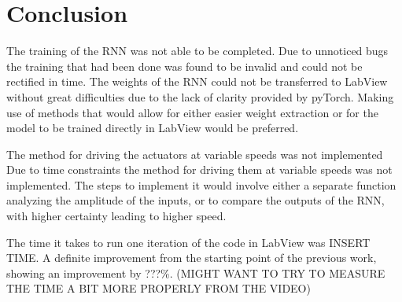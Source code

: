 \section{Conclusion}
\blindtext

The training of the RNN was not able to be completed.
Due to unnoticed bugs the training that had been done was found to be invalid and could not be rectified in time.
The
weights of the RNN could not be transferred to LabView without great difficulties due to the lack of clarity provided by
pyTorch. Making use of methods that would allow for either easier weight extraction or for the model to be trained
directly in LabView would be preferred.


The method for driving the actuators at variable speeds was not implemented
Due to time constraints the method for driving them at variable speeds was not implemented. The steps to implement it
would involve either a separate function analyzing the amplitude of the inputs, or to compare the outputs of the RNN,
with higher certainty leading to higher speed.


The time it takes to run one iteration of the code in LabView was INSERT TIME.
A definite improvement from the starting point of the previous work, showing an improvement by ???\%. (MIGHT WANT TO TRY TO MEASURE THE TIME A BIT MORE
PROPERLY FROM THE VIDEO)


